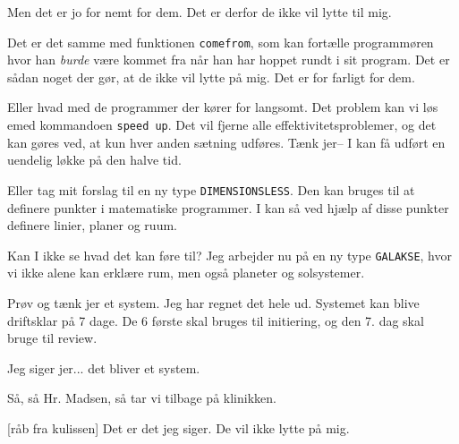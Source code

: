 \documentclass[a4paper,11pt]{article}
\begin{document}
\begin{sketch}

 Men det er jo for nemt for dem.  Det er derfor de ikke vil lytte til mig.

 Det er det samme med funktionen {\tt comefrom}, som kan
fortælle programmøren hvor han {\em burde} være kommet fra når han har
hoppet rundt i sit program.  Det er sådan noget der gør, at de ikke
vil lytte på mig.  Det er for farligt for dem.

 Eller hvad med de programmer der kører for langsomt.  Det
problem kan vi løs emed kommandoen {\tt speed up}.  Det vil fjerne
alle effektivitetsproblemer, og det kan gøres ved, at kun hver anden
sætning udføres.  Tænk jer-- I kan få udført en uendelig løkke på den
halve tid.

 Eller tag mit forslag til en ny type {\tt DIMENSIONSLESS}.
Den kan bruges til at definere punkter i matematiske programmer.  I
kan så ved hjælp af disse punkter definere linier, planer og ruum.

 Kan I ikke se hvad det kan føre til?  Jeg arbejder nu på en
ny type {\tt GALAKSE}, hvor vi ikke alene kan erklære rum, men også
planeter og solsystemer.

 Prøv og tænk jer et system.  Jeg har regnet det hele ud.
Systemet kan blive driftsklar på 7 dage.  De 6 første skal bruges til
initiering, og den 7. dag skal bruge til review.

 Jeg siger jer... det bliver et system.


 Så, så Hr. Madsen, så tar vi tilbage på klinikken.

[råb fra kulissen] Det er det jeg siger.  De vil ikke lytte på
mig.

\end{sketch}
\end{document}
